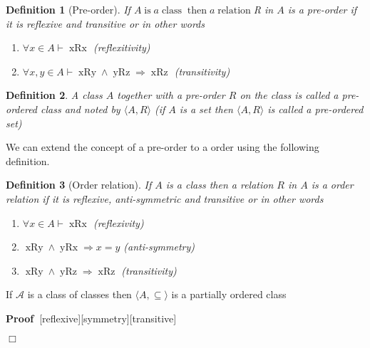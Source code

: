 \documentclass{book}
\newcommand{\tmop}[1]{\ensuremath{\operatorname{#1}}}
\newenvironment{proof}{\noindent\textbf{Proof\ }}{\hspace*{\fill}$\Box$\medskip}
\newtheorem{definition}{Definition}
{\theorembodyfont{\rmfamily}\newtheorem{example}{Example}}
\begin{document}
{{\begin{definition}[Pre-order]
  \label{pre-order}{}If $A \tmop{is} a \tmop{class}
  \tmop{then} a \tmop{relation}$R in $A$ is a pre-order if it is reflexive and
  transitive or in other words
  \begin{enumerate}
    \item $\forall x \in A \vdash \tmop{xRx}$ (reflexitivity)
    
    \item $\forall x, y \in A \vdash \tmop{xRy} \wedge \tmop{yRz} \Rightarrow
    \tmop{xRz}$ (transitivity)
  \end{enumerate}
\end{definition}

\begin{definition}
  \label{pre-ordered class}{}A class $A$ together
  with a pre-order $R$ on the class is called a pre-ordered class and noted by
  $\langle A, R \rangle$ (if $A$ is a set then $\langle A, R \rangle$ is
  called a pre-ordered set)
\end{definition}

We can extend the concept of a pre-order to a order using the following
definition.

\begin{definition}[Order relation]
  \label{order relation}{}If $A$ is a class then a
  relation $R$ in $A$ is a order relation if it is reflexive, anti-symmetric
  and transitive or in other words
  \begin{enumerate}
    \item $\forall x \in A \vdash \tmop{xRx}$ (reflexivity)
    
    \item $\tmop{xRy} \wedge \tmop{yRx} \Rightarrow x = y$ (anti-symmetry)
    
    \item $\tmop{xRy} \wedge \tmop{yRz} \Rightarrow \tmop{xRz}$ (transitivity)
  \end{enumerate}
\end{definition}

\begin{example}
  \label{inclusion is partial order}If $\mathcal{A}$ is a class of classes
  then $\langle A, \subseteq \rangle$ is a partially ordered class
\end{example}

\begin{proof}[reflexive][symmetry][transitive]
  

\end{proof}}}
\end{document}
